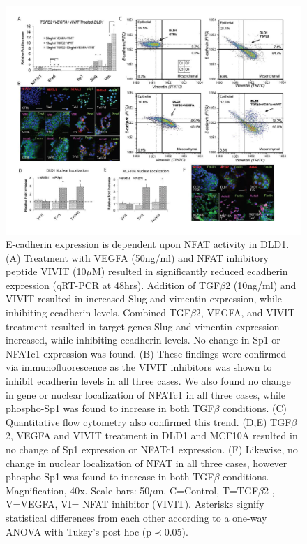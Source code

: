 \documentclass[12pt]{article}
\begin{document}
\begin{figure}
\includegraphics [width=1.0\linewidth] {./figs/Fig-4-Supplemental-DLD1-FlowCyto.pdf}
\caption{E-cadherin expression is dependent upon NFAT activity in DLD1.
(A) Treatment with VEGFA (50ng/ml) and NFAT inhibitory peptide VIVIT (10$\mu$M) resulted in significantly reduced ecadherin expression (qRT-PCR at 48hrs).
Addition of TGF$\beta$2 (10ng/ml) and VIVIT resulted in increased Slug and vimentin expression, while inhibiting ecadherin levels.
Combined TGF$\beta$2, VEGFA, and VIVIT treatment resulted in target genes Slug and vimentin expression increased, while inhibiting ecadherin levels.
No change in Sp1 or NFATc1 expression was found.
(B) These findings were confirmed via immunofluorescence as the VIVIT inhibitors was shown to inhibit ecadherin levels in all three cases.
We also found no change in gene or nuclear localization of NFATc1 in all three cases, while phospho-Sp1 was found to increase in both TGF$\beta$ conditions.
(C) Quantitative flow cytometry also confirmed this trend.
(D,E)  TGF$\beta$2, VEGFA and VIVIT treatment in DLD1 and MCF10A resulted in no change of Sp1 expression or NFATc1 expression.
(F)  Likewise, no change in nuclear localization of NFAT in all three cases, however phospho-Sp1 was found to increase in both TGF$\beta$ conditions.
Magnification, 40x. Scale bars: 50$\mu$m.  C=Control, T=TGF$\beta$2 , V=VEGFA, VI= NFAT inhibitor (VIVIT).
Asterisks signify statistical differences from each other according to a one-way ANOVA with Tukey's post hoc (p$\prec$0.05).}\label{fg:S4}
\end{figure}
\end{document}
